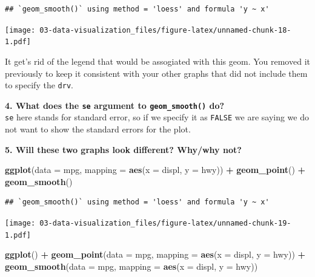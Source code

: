 \documentclass[]{book}
\newenvironment{Shaded}{\begin{snugshade}}{\end{snugshade}}
\newcommand{\DataTypeTok}[1]{\textcolor[rgb]{0.13,0.29,0.53}{#1}}
\newcommand{\KeywordTok}[1]{\textcolor[rgb]{0.13,0.29,0.53}{\textbf{#1}}}
\newcommand{\NormalTok}[1]{#1}
\newcommand{\OperatorTok}[1]{\textcolor[rgb]{0.81,0.36,0.00}{\textbf{#1}}}
\newcommand{\StringTok}[1]{\textcolor[rgb]{0.31,0.60,0.02}{#1}}
\theoremstyle{definition}
\theoremstyle{definition}
\theoremstyle{definition}
\theoremstyle{remark}
\begin{document}
\begin{verbatim}
## `geom_smooth()` using method = 'loess' and formula 'y ~ x'
\end{verbatim}

\texttt{[image: 03-data-visualization\_files/figure-latex/unnamed-chunk-18-1.pdf]}

It get's rid of the legend that would be assogiated with this geom. You
removed it previously to keep it consistent with your other graphs that
did not include them to specify the \texttt{drv}.

\textbf{4. What does the \texttt{se} argument to \texttt{geom\_smooth()}
do?}\\
\texttt{se} here stands for standard error, so if we specify it as
\texttt{FALSE} we are saying we do not want to show the standard errors
for the plot.

\textbf{5. Will these two graphs look different? Why/why not?}

\begin{Shaded}
\begin{Highlighting}[]
\KeywordTok{ggplot}\NormalTok{(}\DataTypeTok{data =}\NormalTok{ mpg, }\DataTypeTok{mapping =} \KeywordTok{aes}\NormalTok{(}\DataTypeTok{x =}\NormalTok{ displ, }\DataTypeTok{y =}\NormalTok{ hwy)) }\OperatorTok{+}\StringTok{ }
\StringTok{  }\KeywordTok{geom_point}\NormalTok{() }\OperatorTok{+}\StringTok{ }
\StringTok{  }\KeywordTok{geom_smooth}\NormalTok{()}
\end{Highlighting}
\end{Shaded}

\begin{verbatim}
## `geom_smooth()` using method = 'loess' and formula 'y ~ x'
\end{verbatim}

\texttt{[image: 03-data-visualization\_files/figure-latex/unnamed-chunk-19-1.pdf]}

\begin{Shaded}
\begin{Highlighting}[]
\KeywordTok{ggplot}\NormalTok{() }\OperatorTok{+}\StringTok{ }
\StringTok{  }\KeywordTok{geom_point}\NormalTok{(}\DataTypeTok{data =}\NormalTok{ mpg, }\DataTypeTok{mapping =} \KeywordTok{aes}\NormalTok{(}\DataTypeTok{x =}\NormalTok{ displ, }\DataTypeTok{y =}\NormalTok{ hwy)) }\OperatorTok{+}\StringTok{ }
\StringTok{  }\KeywordTok{geom_smooth}\NormalTok{(}\DataTypeTok{data =}\NormalTok{ mpg, }\DataTypeTok{mapping =} \KeywordTok{aes}\NormalTok{(}\DataTypeTok{x =}\NormalTok{ displ, }\DataTypeTok{y =}\NormalTok{ hwy))}
\end{Highlighting}
\end{Shaded}
\end{document}
